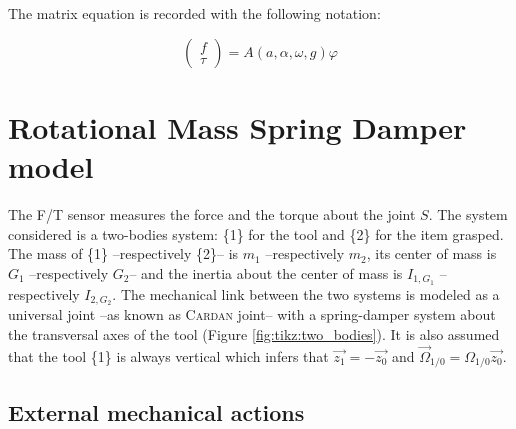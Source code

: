 \documentclass[\main/main.tex]{subfiles}
\begin{document}
The matrix equation is recorded with the following notation:

\begin{equation}
  \label{appendix:rigid:matrix}
 \begin{pmatrix}
  f    \\
  \tau
 \end{pmatrix}
 = A(a, \alpha, \omega, g) \varphi
\end{equation}

\newpage

\section{Rotational Mass Spring Damper model}
\label{appendix:rmsd}

The F/T sensor measures the force and the torque about the joint $S$.
The system considered is a two-bodies system: \{1\} for the tool and \{2\} for the item grasped. The mass of \{1\} –respectively \{2\}– is $m_1$ –respectively $m_2$, its center of mass is $G_1$ –respectively $G_2$– and the inertia about the center of mass is $I_{1, G_1}$ –respectively $I_{2, G_2}$. The mechanical link between the two systems is modeled as a universal joint –as known as \textsc{Cardan} joint– with a spring-damper system about the transversal axes of the tool (Figure \ref{fig:tikz:two_bodies}). It is also assumed that the tool \{1\} is always vertical which infers that $\overrightarrow{z_1} = -\overrightarrow{z_0}$ and $\overrightarrow{\Omega}_{1/0} = \Omega_{1/0} \overrightarrow{z_0}$.

\subsection{External mechanical actions}
\end{document}
